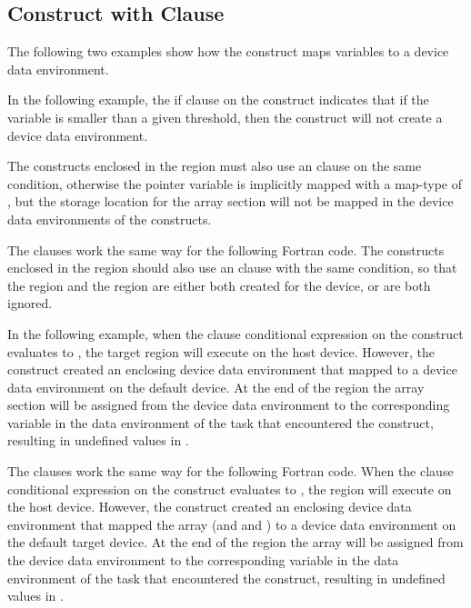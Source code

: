 
\subsection{  Construct with  Clause}
\label{subsec:target_data_if}

The following two examples show how the   construct 
maps variables to a device data environment.

In the following example, the if clause on the   construct 
indicates that if the variable  is smaller than a given threshold, then the  
 construct will not create a device data environment.

The  constructs enclosed in the   region 
must also use an  clause on the same condition, otherwise the pointer 
variable  is implicitly mapped with a map-type of , but the storage 
location for the array section  will not be mapped in the device data environments 
of the  constructs.


The  clauses work the same way for the following Fortran code. The  
constructs enclosed in the   region should also use 
an  clause with the same condition, so that the   
region and the  region are either both created for the device, or 
are both ignored.


In the following example, when the  clause conditional expression on 
the  construct evaluates to , the target region will 
execute on the host device. However, the   construct 
created an enclosing device data environment that mapped  to a device data 
environment on the default device. At the end of the   
region the array section  will be assigned from the device data environment 
to the corresponding variable in the data environment of the task that encountered 
the   construct, resulting in undefined values in .


The  clauses work the same way for the following Fortran code. When 
the  clause conditional expression on the  construct 
evaluates to , the  region will execute on the host 
device. However, the   construct created an enclosing 
device data environment that mapped the  array (and  and ) to a device data 
environment on the default target device. At the end of the   
region the  array will be assigned from the device data environment to the corresponding 
variable in the data environment of the task that encountered the  
 construct, resulting in undefined values in .


